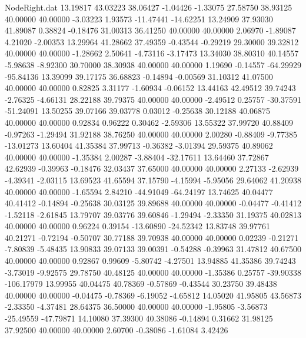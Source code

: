 \begin{filecontents}{NodeRight.dat}
  13.19817   43.03223   38.06427    -1.04426   -1.33075   27.58750   38.93125   40.00000   40.00000   -3.03223    1.93573  -11.47441  -14.62251
  13.24909   37.93030   41.89087     0.38824   -0.18476   31.00313   36.41250   40.00000   40.00000    2.06970   -1.89087    4.21020   -2.00353
  13.29964   41.28662   37.49359    -0.43544   -0.29219   29.30000   39.32812   40.00000   40.00000   -1.28662    2.50641   -4.73116   -3.17473
  13.34030   38.80310   40.14557    -5.98638   -8.92300   30.70000   38.30938   40.00000   40.00000    1.19690   -0.14557  -64.29929  -95.84136
  13.39099   39.17175   36.68823    -0.14894   -0.00569   31.10312   41.07500   40.00000   40.00000    0.82825    3.31177   -1.60934   -0.06152
  13.44163   42.49512   39.74243    -2.76325   -4.66131   28.22188   39.79375   40.00000   40.00000   -2.49512    0.25757  -30.37591  -51.24091
  13.50255   39.07166   39.03778     0.03012   -0.25638   30.12188   40.06875   40.00000   40.00000    0.92834    0.96222    0.30462   -2.59306
  13.55322   37.99720   40.88409    -0.97263   -1.29494   31.92188   38.76250   40.00000   40.00000    2.00280   -0.88409   -9.77385  -13.01273
  13.60404   41.35384   37.99713    -0.36382   -3.01394   29.59375   40.89062   40.00000   40.00000   -1.35384    2.00287   -3.88404  -32.17611
  13.64460   37.72867   42.62939    -0.39963   -0.18476   32.03437   37.65000   40.00000   40.00000    2.27133   -2.62939   -4.39341   -2.03115
  13.69523   41.65594   37.15790    -4.15994   -5.95056   29.64062   41.20938   40.00000   40.00000   -1.65594    2.84210  -44.91049  -64.24197
  13.74625   40.04477   40.41412    -0.14894   -0.25638   30.03125   39.89688   40.00000   40.00000   -0.04477   -0.41412   -1.52118   -2.61845
  13.79707   39.03776   39.60846    -1.29494   -2.33350   31.19375   40.02813   40.00000   40.00000    0.96224    0.39154  -13.60890  -24.52342
  13.83748   39.97761   40.21271    -0.72194   -0.50707   30.77188   39.70938   40.00000   40.00000    0.02239   -0.21271   -7.80839   -5.48435
  13.90833   39.07133   39.00391    -0.54288   -0.39963   31.47812   40.67500   40.00000   40.00000    0.92867    0.99609   -5.80742   -4.27501
  13.94885   41.35386   39.74243    -3.73019   -9.92575   29.78750   40.48125   40.00000   40.00000   -1.35386    0.25757  -39.90338 -106.17979
  13.99955   40.04475   40.78369    -0.57869   -0.43544   30.23750   39.48438   40.00000   40.00000   -0.04475   -0.78369   -6.19052   -4.65812
  14.05020   41.95805   43.56873    -2.33350   -4.37481   28.64375   36.50000   40.00000   40.00000   -1.95805   -3.56873  -25.49559  -47.79871
  14.10080   37.39300   40.38086    -0.14894    0.31662   31.98125   37.92500   40.00000   40.00000    2.60700   -0.38086   -1.61084    3.42426

\end{filecontents}
